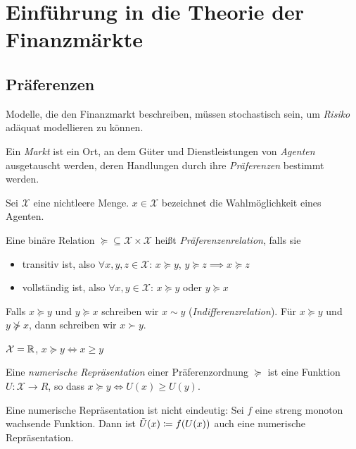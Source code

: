 \documentclass[a4paper,twoside,DIV15,BCOR12mm]{scrbook}
\newcommand{\cX}{\mathcal X}
\begin{document}
\renewcommand{\thesection}{\arabic{chapter}.\arabic{section}}
\renewcommand{\thechapter}{\Roman{chapter}}

\chapter{Einführung in die Theorie der Finanzmärkte}

\section{Präferenzen}

Modelle, die den Finanzmarkt beschreiben, müssen stochastisch sein, um \emph{Risiko} adäquat modellieren zu können.

Ein \emph{Markt} ist ein Ort, an dem Güter und Dienstleistungen von \emph{Agenten} ausgetauscht werden, deren Handlungen durch ihre \emph{Präferenzen} bestimmt werden.

Sei $\cX$ eine nichtleere Menge. $x\in\cX$ bezeichnet die Wahlmöglichkeit eines Agenten.

\begin{definition}
Eine binäre Relation $\succeq \subseteq \cX \times \cX$ heißt \emph{Präferenzenrelation}, falls sie
\begin{itemize}
\item transitiv ist, also $\forall x,y,z \in\cX$: $x\succeq y$, $y\succeq z \implies x\succeq z$
\item vollständig ist, also $\forall x,y\in \cX$: $x\succeq y$ oder $y\succeq x$
\end{itemize}
Falls $x\succeq y$ und $y\succeq x$ schreiben wir $x\sim y$ (\emph{Indifferenzrelation}). Für $x\succeq y$ und $y\not\succeq x$, dann schreiben wir $x\succ y$.
\end{definition}

\begin{beispiel}
$\cX=\MdR$, $x\succeq y \iff x\ge y$
\end{beispiel}

\begin{definition}
Eine \emph{numerische Repräsentation} einer Präferenzordnung $\succeq$ ist eine Funktion $U:\cX\to R$, so dass $x\succeq y \iff U(x) \ge U(y)$.
\end{definition}

\begin{bemerkung}
Eine numerische Repräsentation ist nicht eindeutig: Sei $f$ eine streng monoton wachsende Funktion. Dann ist $\tilde U(x) \da f(U(x))$ auch eine numerische Repräsentation.
\end{bemerkung}
\end{document}
